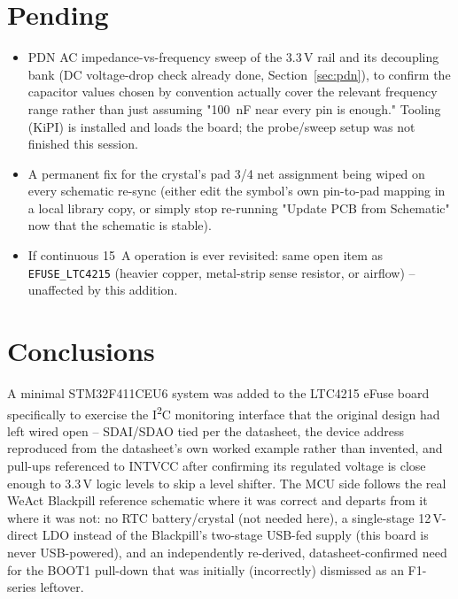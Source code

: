 \documentclass[11pt]{article}
\begin{document}
\section{Pending}
\label{sec:pending}

\begin{pending}
\begin{itemize}
\item PDN AC impedance-vs-frequency sweep of the 3.3\,V rail and its decoupling bank (DC voltage-drop
  check already done, Section~\ref{sec:pdn}), to confirm the capacitor values chosen by convention
  actually cover the relevant frequency range rather than just assuming "\SI{100}{\nano\farad} near
  every pin is enough." Tooling (KiPI) is installed and loads the board; the probe/sweep setup was not
  finished this session.
\item A permanent fix for the crystal's pad 3/4 net assignment being wiped on every schematic re-sync
  (either edit the symbol's own pin-to-pad mapping in a local library copy, or simply stop re-running
  "Update PCB from Schematic" now that the schematic is stable).
\item If continuous \SI{15}{\ampere} operation is ever revisited: same open item as
  \texttt{EFUSE\_LTC4215} (heavier copper, metal-strip sense resistor, or airflow) -- unaffected by
  this addition.
\end{itemize}
\end{pending}

\section{Conclusions}

A minimal STM32F411CEU6 system was added to the LTC4215 eFuse board specifically to exercise the
I\textsuperscript{2}C monitoring interface that the original design had left wired open -- SDAI/SDAO
tied per the datasheet, the device address reproduced from the datasheet's own worked example rather
than invented, and pull-ups referenced to INTVCC after confirming its regulated voltage is close
enough to 3.3\,V logic levels to skip a level shifter. The MCU side follows the real WeAct Blackpill
reference schematic where it was correct and departs from it where it was not: no RTC battery/crystal
(not needed here), a single-stage 12\,V-direct LDO instead of the Blackpill's two-stage USB-fed supply
(this board is never USB-powered), and an independently re-derived, datasheet-confirmed need for the
BOOT1 pull-down that was initially (incorrectly) dismissed as an F1-series leftover.
\end{document}
